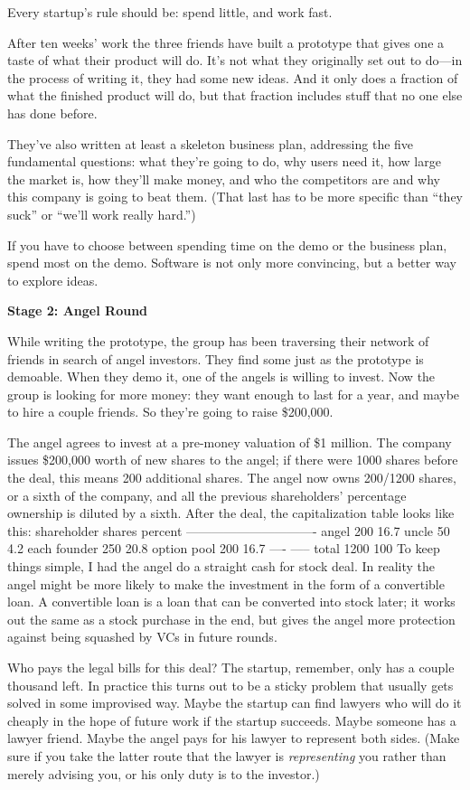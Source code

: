 Every startup's rule should be: spend little, and work fast.

After ten weeks' work the three friends have built a prototype that
gives one a taste of what their product will do. It's not what they
originally set out to do---in the process of writing it, they had some
new ideas. And it only does a fraction of what the finished product will
do, but that fraction includes stuff that no one else has done before.

They've also written at least a skeleton business plan, addressing the
five fundamental questions: what they're going to do, why users need it,
how large the market is, how they'll make money, and who the competitors
are and why this company is going to beat them. (That last has to be
more specific than ``they suck'' or ``we'll work really hard.'')

If you have to choose between spending time on the demo or the business
plan, spend most on the demo. Software is not only more convincing, but
a better way to explore ideas.

\textbf{Stage 2: Angel Round}

While writing the prototype, the group has been traversing their network
of friends in search of angel investors. They find some just as the
prototype is demoable. When they demo it, one of the angels is willing
to invest. Now the group is looking for more money: they want enough to
last for a year, and maybe to hire a couple friends. So they're going to
raise \$200,000.

The angel agrees to invest at a pre-money valuation of \$1 million. The
company issues \$200,000 worth of new shares to the angel; if there were
1000 shares before the deal, this means 200 additional shares. The angel
now owns 200/1200 shares, or a sixth of the company, and all the
previous shareholders' percentage ownership is diluted by a sixth. After
the deal, the capitalization table looks like this: shareholder shares
percent ------------------------------- angel 200 16.7 uncle 50 4.2 each
founder 250 20.8 option pool 200 16.7 ---- ----- total 1200 100 To keep
things simple, I had the angel do a straight cash for stock deal. In
reality the angel might be more likely to make the investment in the
form of a convertible loan. A convertible loan is a loan that can be
converted into stock later; it works out the same as a stock purchase in
the end, but gives the angel more protection against being squashed by
VCs in future rounds.

Who pays the legal bills for this deal? The startup, remember, only has
a couple thousand left. In practice this turns out to be a sticky
problem that usually gets solved in some improvised way. Maybe the
startup can find lawyers who will do it cheaply in the hope of future
work if the startup succeeds. Maybe someone has a lawyer friend. Maybe
the angel pays for his lawyer to represent both sides. (Make sure if you
take the latter route that the lawyer is \emph{representing} you rather
than merely advising you, or his only duty is to the investor.)

